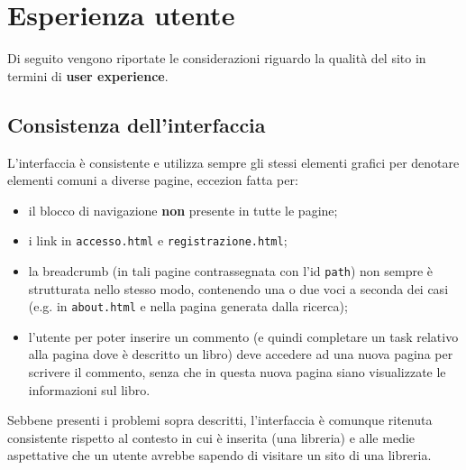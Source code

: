 



\section{Esperienza utente}\label{sec:user-exp}
Di seguito vengono riportate le considerazioni riguardo la qualità del sito in
termini di \textbf{user experience}.

\subsection{Consistenza dell'interfaccia}\label{sec:user-ui_consistency}
L'interfaccia è consistente e utilizza sempre gli stessi elementi grafici per
denotare elementi comuni a diverse pagine, eccezion fatta per:
\begin{itemize}
\item il blocco di navigazione \textbf{non} presente in tutte le pagine;
\item i link in \texttt{accesso.html} e \texttt{registrazione.html};
\item la breadcrumb (in tali pagine contrassegnata con l'id \texttt{path}) non
sempre è strutturata nello stesso modo, contenendo una o due voci a seconda
dei casi (e.g. in \texttt{about.html} e nella pagina generata dalla ricerca);
\item l'utente per poter inserire un commento (e quindi completare un task
relativo alla pagina dove è descritto un libro) deve accedere ad una nuova
pagina per scrivere il commento, senza che in questa nuova pagina siano
visualizzate le informazioni sul libro.
\end{itemize}

Sebbene presenti i problemi sopra descritti, l'interfaccia è comunque ritenuta
consistente rispetto al contesto in cui è inserita (una libreria) e alle
medie aspettative che un utente avrebbe sapendo di visitare un sito di una
libreria.

